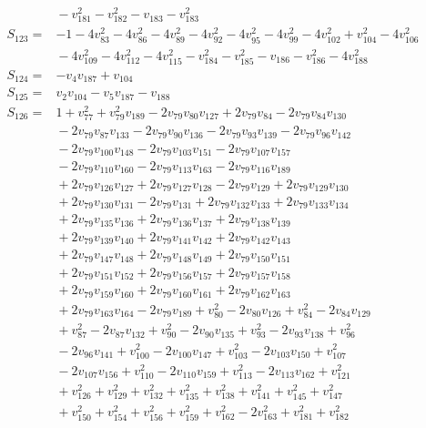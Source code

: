 \documentclass[11pt]{article}
\begin{document}
\begin{align*}
&{}-v_{181}^{2}-v_{182}^{2}-v_{183}-v_{183}^{2}\\
S_{123}={}&-1-4v_{83}^{2}-4v_{86}^{2}-4v_{89}^{2}-4v_{92}^{2}-4v_{95}^{2}-4v_{99}^{2}-4v_{102}^{2}+v_{104}^{2}-4v_{106}^{2}\\
&{}-4v_{109}^{2}-4v_{112}^{2}-4v_{115}^{2}-v_{184}^{2}-v_{185}^{2}-v_{186}-v_{186}^{2}-4v_{188}^{2}\\
S_{124}={}&-v_{4}v_{187}+v_{104}\\
S_{125}={}&v_{2}v_{104}-v_{5}v_{187}-v_{188}\\
S_{126}={}&1+v_{77}^{2}+v_{79}^{2}v_{189}-2v_{79}v_{80}v_{127}+2v_{79}v_{84}-2v_{79}v_{84}v_{130}\\
&{}-2v_{79}v_{87}v_{133}-2v_{79}v_{90}v_{136}-2v_{79}v_{93}v_{139}-2v_{79}v_{96}v_{142}\\
&{}-2v_{79}v_{100}v_{148}-2v_{79}v_{103}v_{151}-2v_{79}v_{107}v_{157}\\
&{}-2v_{79}v_{110}v_{160}-2v_{79}v_{113}v_{163}-2v_{79}v_{116}v_{189}\\
&{}+2v_{79}v_{126}v_{127}+2v_{79}v_{127}v_{128}-2v_{79}v_{129}+2v_{79}v_{129}v_{130}\\
&{}+2v_{79}v_{130}v_{131}-2v_{79}v_{131}+2v_{79}v_{132}v_{133}+2v_{79}v_{133}v_{134}\\
&{}+2v_{79}v_{135}v_{136}+2v_{79}v_{136}v_{137}+2v_{79}v_{138}v_{139}\\
&{}+2v_{79}v_{139}v_{140}+2v_{79}v_{141}v_{142}+2v_{79}v_{142}v_{143}\\
&{}+2v_{79}v_{147}v_{148}+2v_{79}v_{148}v_{149}+2v_{79}v_{150}v_{151}\\
&{}+2v_{79}v_{151}v_{152}+2v_{79}v_{156}v_{157}+2v_{79}v_{157}v_{158}\\
&{}+2v_{79}v_{159}v_{160}+2v_{79}v_{160}v_{161}+2v_{79}v_{162}v_{163}\\
&{}+2v_{79}v_{163}v_{164}-2v_{79}v_{189}+v_{80}^{2}-2v_{80}v_{126}+v_{84}^{2}-2v_{84}v_{129}\\
&{}+v_{87}^{2}-2v_{87}v_{132}+v_{90}^{2}-2v_{90}v_{135}+v_{93}^{2}-2v_{93}v_{138}+v_{96}^{2}\\
&{}-2v_{96}v_{141}+v_{100}^{2}-2v_{100}v_{147}+v_{103}^{2}-2v_{103}v_{150}+v_{107}^{2}\\
&{}-2v_{107}v_{156}+v_{110}^{2}-2v_{110}v_{159}+v_{113}^{2}-2v_{113}v_{162}+v_{121}^{2}\\
&{}+v_{126}^{2}+v_{129}^{2}+v_{132}^{2}+v_{135}^{2}+v_{138}^{2}+v_{141}^{2}+v_{145}^{2}+v_{147}^{2}\\
&{}+v_{150}^{2}+v_{154}^{2}+v_{156}^{2}+v_{159}^{2}+v_{162}^{2}-2v_{163}^{2}+v_{181}^{2}+v_{182}^{2}\\

\end{align*}
\end{document}
